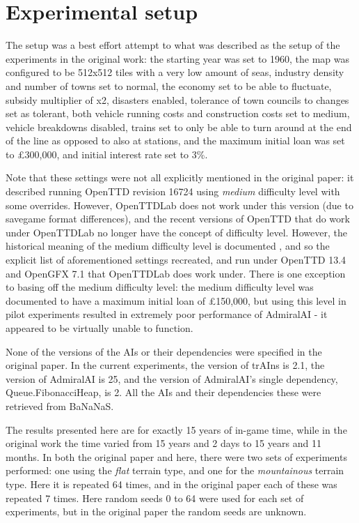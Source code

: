 \documentclass[logo,msc,dsti]{style/infthesis}    %
\begin{document}
{\section{Experimental setup}

The setup was a best effort attempt to what was described as the setup of the experiments in the original work: the starting year was set to 1960, the map was configured to be 512x512 tiles with a very low amount of seas, industry density and number of towns set to normal, the economy set to be able to fluctuate, subsidy multiplier of x2, disasters enabled, tolerance of town councils to changes set as tolerant, both vehicle running costs and construction costs set to medium, vehicle breakdowns disabled, trains set to only be able to turn around at the end of the line as opposed to also at stations, and the maximum initial loan was set to £300,000, and initial interest rate set to 3\%.

Note that these settings were not all explicitly mentioned in the original paper: it described running OpenTTD revision 16724 using \emph{medium} difficulty level with some overrides. However, OpenTTDLab does not work under this version (due to savegame format differences), and the recent versions of OpenTTD that do work under OpenTTDLab no longer have the concept of difficulty level. However, the historical meaning of the medium difficulty level is documented \cite{OpenTTDDifficultyLevels}, and so the explicit list of aforementioned settings recreated, and run under OpenTTD 13.4 and OpenGFX 7.1 that OpenTTDLab does work under. There is one exception to basing off the medium difficulty level: the medium difficulty level was documented to have a maximum initial loan of £150,000, but using this level in pilot experiments resulted in extremely poor performance of AdmiralAI - it appeared to be virtually unable to function.

None of the versions of the AIs or their dependencies were specified in the original paper. In the current experiments, the version of trAIns is 2.1,  the version of AdmiralAI is 25, and the version of AdmiralAI's single dependency, Queue.FibonacciHeap, is 2. All the AIs and their dependencies these were retrieved from BaNaNaS.

The results presented here are for exactly 15 years of in-game time, while in the original work the time varied from 15 years and 2 days to 15 years and 11 months. In both the original paper and here, there were two sets of experiments performed: one using the \emph{flat} terrain type, and one for the \emph{mountainous} terrain type. Here it is repeated 64 times, and in the original paper each of these was repeated 7 times. Here random seeds 0 to 64 were used for each set of experiments, but in the original paper the random seeds are unknown.

}
\end{document}
